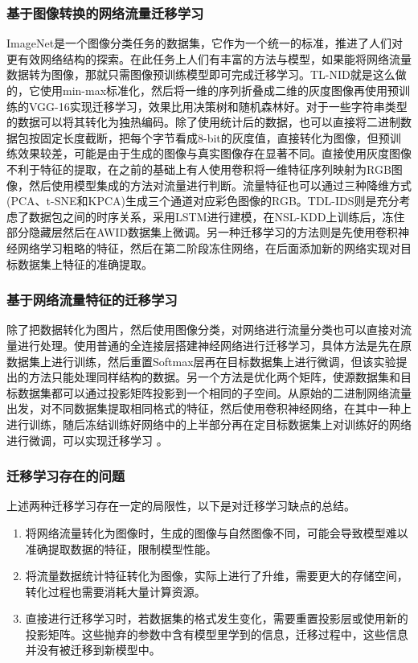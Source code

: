 \subsubsection{基于图像转换的网络流量迁移学习}
ImageNet是一个图像分类任务的数据集，它作为一个统一的标准，推进了人们对更有效网络结构的探索。在此任务上人们有丰富的方法与模型，如果能将网络流量数据转为图像，那就只需图像预训练模型即可完成迁移学习。TL-NID就是这么做的，它使用min-max标准化，然后将一维的序列折叠成二维的灰度图像再使用预训练的VGG-16实现迁移学习，效果比用决策树和随机森林好\cite{10.23919/ICITST51030.2020.9351317}。对于一些字符串类型的数据可以将其转化为独热编码\cite{10.1109/ACCESS.2020.2972627}。除了使用统计后的数据，也可以直接将二进制数据包按固定长度截断，把每个字节看成8-bit的灰度值，直接转化为图像，但预训练效果较差，可能是由于生成的图像与真实图像存在显著不同\cite{10.3390/info13120553}。直接使用灰度图像不利于特征的提取，在之前的基础上有人使用卷积将一维特征序列映射为RGB图像，然后使用模型集成的方法对流量进行判断\cite{10.1109/ACCESS.2022.3233775}。流量特征也可以通过三种降维方式(PCA、t-SNE和KPCA)生成三个通道对应彩色图像的RGB\cite{10.1016/j.future.2021.07.015}。TDL-IDS\cite{10.1109/GLOBECOM48099.2022.10001267}则是充分考虑了数据包之间的时序关系，采用LSTM进行建模，在NSL-KDD上训练后，冻住部分隐藏层然后在AWID数据集上微调。另一种迁移学习的方法则是先使用卷积神经网络学习粗略的特征，然后在第二阶段冻住网络，在后面添加新的网络实现对目标数据集上特征的准确提取\cite{10.1109/ICBDA.2019.8713213}。

\subsubsection{基于网络流量特征的迁移学习}
除了把数据转化为图片，然后使用图像分类，对网络进行流量分类也可以直接对流量进行处理。使用普通的全连接层搭建神经网络进行迁移学习，具体方法是先在原数据集上进行训练，然后重置Softmax层再在目标数据集上进行微调，但该实验提出的方法只能处理同样结构的数据\cite{10.1109/SMARTCOMP.2019.00031}。另一个方法是优化两个矩阵，使源数据集和目标数据集都可以通过投影矩阵投影到一个相同的子空间\cite{10.1109/MILCOM.2017.8170749}。从原始的二进制网络流量出发，对不同数据集提取相同格式的特征，然后使用卷积神经网络，在其中一种上进行训练，随后冻结训练好网络中的上半部分再在定目标数据集上对训练好的网络进行微调，可以实现迁移学习 \cite{10.1016/j.eswa.2022.118641}。

\subsubsection{迁移学习存在的问题}
上述两种迁移学习存在一定的局限性，以下是对迁移学习缺点的总结。
\begin{enumerate}
    \item 将网络流量转化为图像时，生成的图像与自然图像不同，可能会导致模型难以准确提取数据的特征，限制模型性能。
    \item 将流量数据统计特征转化为图像，实际上进行了升维，需要更大的存储空间，转化过程也需要消耗大量计算资源。
    \item 直接进行迁移学习时，若数据集的格式发生变化，需要重置投影层或使用新的投影矩阵。这些抛弃的参数中含有模型里学到的信息，迁移过程中，这些信息并没有被迁移到新模型中。
\end{enumerate}

